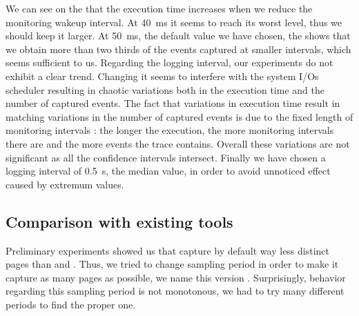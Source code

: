 We can see on the  that the execution time increases when we
reduce the monitoring wakeup interval. At \SI{40}{ms}
it seems to reach its worst level, thus we should keep it larger. At \SI{50}{ms}, the default value we have chosen, the
 shows that we obtain more than two thirds of the events captured
at smaller intervals, which seems sufficient to us.
Regarding the logging interval, our experiments do not exhibit a clear trend. Changing it seems to interfere with the system I/Os scheduler resulting in chaotic
variations both in the execution time and the number of captured events. The fact that variations in execution time result in matching variations in the number
of captured events is due to the fixed length of monitoring intervals : the longer the execution, the more monitoring intervals there are and the more events
the trace contains. Overall these variations are not significant as all the confidence intervals intersect. 
Finally we have chosen a logging interval of \SI{0.5}{s}, the median value, in order to avoid unnoticed effect caused by extremum values.



\subsection{Comparison with existing tools}
\label{sec:expe-ovh}

Preliminary experiments showed us that \Mitos capture by
default way less distinct pages than \TABARNAC and \Moca. Thus, we tried to change \Mitos
sampling period in order to make it capture as many pages as possible, 
we name this version \MitosTun. Surprisingly, \Mitos behavior regarding this sampling period
is not monotonous, we had to try many different periods to find the proper one.

